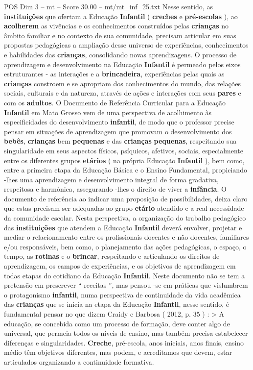 \begin{textsample}{POS Dim 3 – mt – Score 30.00 – mt/mt\_inf\_25.txt}
Nesse sentido, as \textbf{instituições} que ofertam a Educação \textbf{Infantil} ( \textbf{creches} e \textbf{pré-escolas} ), ao \textbf{acolherem} as vivências e os conhecimentos construídos pelas \textbf{crianças} no âmbito familiar e no contexto de sua comunidade, precisam articular em suas propostas pedagógicas a ampliação desse universo de experiências, conhecimentos e habilidades das \textbf{crianças}, consolidando novas aprendizagens.
O processo de aprendizagem e desenvolvimento na Educação \textbf{Infantil} é permeado pelos eixos estruturantes - as interações e a \textbf{brincadeira}, experiências pelas quais as \textbf{crianças} constroem e se apropriam dos conhecimentos do mundo, das relações sociais, culturais e da natureza, através de ações e interações com seus \textbf{pares} e com os \textbf{adultos}.
O Documento de Referência Curricular para a Educação \textbf{Infantil} em Mato Grosso vem de uma perspectiva de acolhimento às especificidades do desenvolvimento \textbf{infantil}, de modo que o professor precise pensar em situações de aprendizagem que promovam o desenvolvimento dos \textbf{bebês}, \textbf{crianças} bem \textbf{pequenas} e das \textbf{crianças} \textbf{pequenas}, respeitando sua singularidade em seus aspectos físicos, psíquicos, afetivos, sociais, especialmente entre os diferentes grupos \textbf{etários} ( na própria Educação \textbf{Infantil} ), bem como, entre a primeira etapa da Educação Básica e o Ensino Fundamental, propiciando -lhes uma aprendizagem e desenvolvimento integral de forma gradativa, respeitosa e harmônica, assegurando -lhes o direito de viver a \textbf{infância}.
O documento de referência ao indicar uma proposição de possibilidades, deixa claro que estas precisam ser adequadas ao grupo \textbf{etário} atendido e a real necessidade da comunidade escolar.
Nesta perspectiva, a organização do trabalho pedagógico das \textbf{instituições} que atendem a Educação \textbf{Infantil} deverá envolver, projetar e mediar o relacionamento entre os profissionais docentes e não docentes, familiares e/ou responsáveis, bem como, o planejamento das ações pedagógicas, o espaço, o tempo, as \textbf{rotinas} e o \textbf{brincar}, respeitando e articulando os direitos de aprendizagem, os campos de experiências, e os objetivos de aprendizagem em todas etapas do cotidiano da Educação \textbf{Infantil}.
Neste documento não se tem a pretensão em prescrever “ receitas ”, mas pensou -se em práticas que vislumbrem o protagonismo \textbf{infantil}, numa perspectiva de continuidade da vida acadêmica das \textbf{crianças} que se inicia na etapa da Educação \textbf{Infantil}, nesse sentido, é fundamental pensar no que dizem Craidy e Barbosa ( 2012, p. 35 ) : > A educação, se concebida como um processo de formação, deve conter algo de universal, que permeia todos os níveis de ensino, mas também precisa estabelecer diferenças e singularidades. \textbf{Creche}, pré-escola, anos iniciais, anos finais, ensino médio têm objetivos diferentes, mas podem, e acreditamos que devem, estar articulados organizando a continuidade formativa.

\end{textsample}
